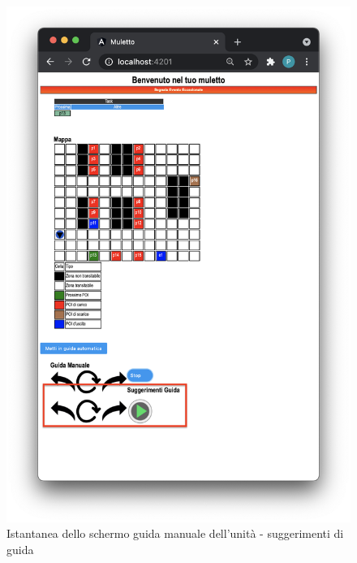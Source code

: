 \begin{itemize}
\begin{figure}[H]
          \includegraphics[scale=0.45]{res/images/suggerimenti.png}
          \caption{Istantanea dello schermo guida manuale dell'unità - suggerimenti di guida}
    \end{figure}
\end{itemize}

